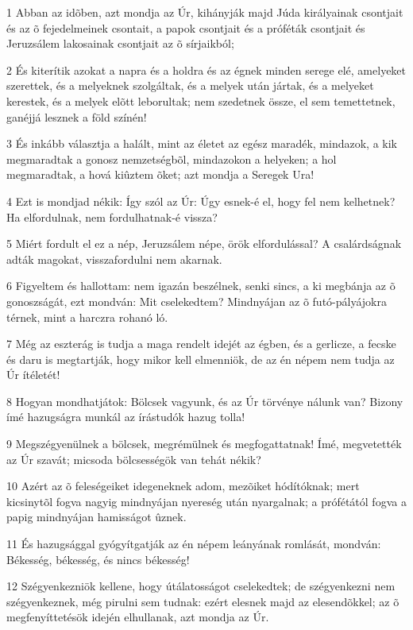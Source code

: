 \par 1 Abban az idõben, azt mondja az Úr, kihányják majd Júda királyainak csontjait és az õ fejedelmeinek csontait, a papok csontjait és a próféták csontjait és Jeruzsálem lakosainak csontjait az õ sírjaikból;
\par 2 És kiterítik azokat a napra és a holdra és az égnek minden serege elé, amelyeket szerettek, és a melyeknek szolgáltak, és a melyek után jártak, és a melyeket kerestek, és a melyek elõtt leborultak; nem szedetnek össze, el sem temettetnek, ganéjjá lesznek a föld színén!
\par 3 És inkább választja a halált, mint az életet az egész maradék, mindazok, a kik megmaradtak a gonosz nemzetségbõl, mindazokon a helyeken; a hol megmaradtak, a hová kiûztem õket; azt mondja a Seregek Ura!
\par 4 Ezt is mondjad nékik: Így szól az Úr: Úgy esnek-é el, hogy fel nem kelhetnek? Ha elfordulnak, nem fordulhatnak-é vissza?
\par 5 Miért fordult el ez a nép, Jeruzsálem népe, örök elfordulással? A csalárdságnak adták magokat, visszafordulni nem akarnak.
\par 6 Figyeltem és hallottam: nem igazán beszélnek, senki sincs, a ki megbánja az õ gonoszságát, ezt mondván: Mit cselekedtem? Mindnyájan az õ futó-pályájokra térnek, mint a harczra rohanó ló.
\par 7 Még az eszterág is tudja a maga rendelt idejét az égben, és a gerlicze, a fecske és daru is megtartják, hogy mikor kell elmenniök, de az én népem nem tudja az Úr ítéletét!
\par 8 Hogyan mondhatjátok: Bölcsek vagyunk, és az Úr törvénye nálunk van? Bizony ímé hazugságra munkál az írástudók hazug tolla!
\par 9 Megszégyenülnek a bölcsek, megrémülnek és megfogattatnak! Ímé, megvetették az Úr szavát; micsoda bölcsességök van tehát nékik?
\par 10 Azért az õ feleségeiket idegeneknek adom, mezõiket hódítóknak; mert kicsinytõl fogva nagyig mindnyájan nyereség után nyargalnak; a prófétától fogva a papig mindnyájan hamisságot ûznek.
\par 11 És hazugsággal gyógyítgatják az én népem leányának romlását, mondván: Békesség, békesség, és nincs békesség!
\par 12 Szégyenkezniök kellene, hogy útálatosságot cselekedtek; de szégyenkezni nem szégyenkeznek, még pirulni sem tudnak: ezért elesnek majd az elesendõkkel; az õ megfenyíttetésök idején elhullanak, azt mondja az Úr.

